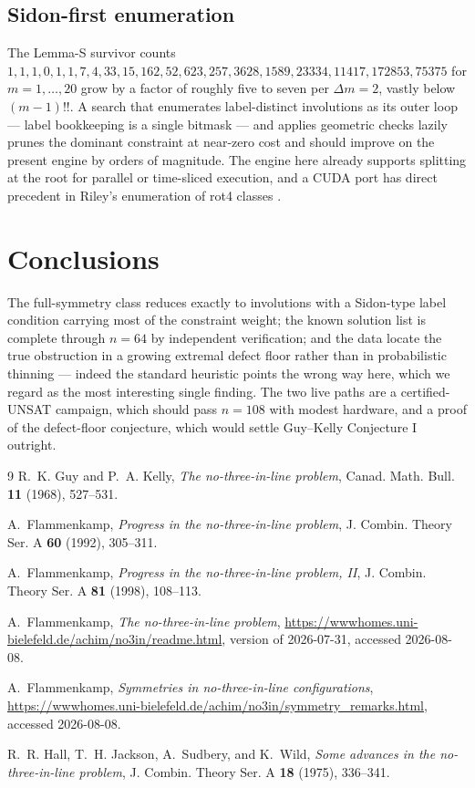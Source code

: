 \documentclass[11pt]{article}
\theoremstyle{remark}
\begin{document}
\subsection{Sidon-first enumeration}

The Lemma-S survivor counts
$1,1,1,0,1,1,7,4,33,15,162,52,623,257,3628,1589,23334,11417,172853,75375$
for $m=1,\dots,20$
grow by a factor of roughly five to seven per $\Delta m=2$,
vastly below $(m-1)!!$.
A search that enumerates label-distinct involutions as its outer loop ---
label bookkeeping is a single bitmask ---
and applies geometric checks lazily prunes the dominant constraint at
near-zero cost and should improve on the present engine by orders of
magnitude.
The engine here already supports splitting at the root for
parallel or time-sliced execution,
and a CUDA port has direct precedent in Riley's enumeration of
\textsf{rot4} classes \cite{FlamSite}.

\section{Conclusions}

The full-symmetry class reduces exactly to involutions with a
Sidon-type label condition carrying most of the constraint weight;
the known solution list is complete through $n=64$ by independent
verification;
and the data locate the true obstruction in a growing extremal defect floor
rather than in probabilistic thinning ---
indeed the standard heuristic points the wrong way here,
which we regard as the most interesting single finding.
The two live paths are a certified-UNSAT campaign,
which should pass $n=108$ with modest hardware,
and a proof of the defect-floor conjecture,
which would settle Guy--Kelly Conjecture I outright.

\begin{thebibliography}{9}
R.~K. Guy and P.~A. Kelly,
\emph{The no-three-in-line problem},
Canad. Math. Bull. \textbf{11} (1968), 527--531.

A.~Flammenkamp,
\emph{Progress in the no-three-in-line problem},
J. Combin. Theory Ser. A \textbf{60} (1992), 305--311.

A.~Flammenkamp,
\emph{Progress in the no-three-in-line problem, II},
J. Combin. Theory Ser. A \textbf{81} (1998), 108--113.

A.~Flammenkamp,
\emph{The no-three-in-line problem},
\url{https://wwwhomes.uni-bielefeld.de/achim/no3in/readme.html},
version of 2026-07-31, accessed 2026-08-08.

A.~Flammenkamp,
\emph{Symmetries in no-three-in-line configurations},
\url{https://wwwhomes.uni-bielefeld.de/achim/no3in/symmetry_remarks.html},
accessed 2026-08-08.

R.~R. Hall, T.~H. Jackson, A.~Sudbery, and K.~Wild,
\emph{Some advances in the no-three-in-line problem},
J. Combin. Theory Ser. A \textbf{18} (1975), 336--341.
\end{thebibliography}
\end{document}
